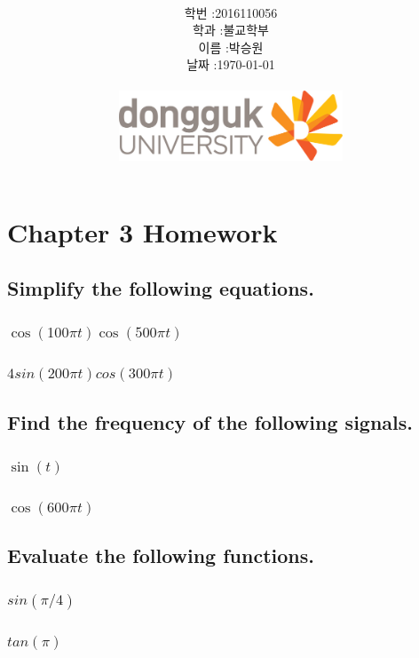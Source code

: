 \documentclass[12pt,a4paper]{article}
\title{
	\centering
	\pgfornament[width=12cm,color=teal]{84}\\
	\vspace{1cm}
	\fontsize{50}{50} \selectfont {정보통신 수학 및 실습\\Homework}\\
		\pgfornament[width=12cm,color=teal]{88}\\
	\vfill}
\author{
	\LARGE
	\begin{tabular}{rl}
		\hline
		학번 : & 2016110056\\ 
		학과 : & 불교학부 \\
		이름 : & 박승원\\
		날짜 : & \today\\
		\hline
	\end{tabular}\vspace{2cm}
	\\
\includegraphics[width=0.5\textwidth]{logo.jpg}
	}
\date{}
\begin{document}
\maketitle
{}
\noindent
\lstset{language=matlab, columns=flexible, tabsize=4, frame=shadowbox, showstringspaces=false, breaklines=true, upquote=true, basicstyle=\normalsize}

\renewcommand{\thesubsubsection}{\alph{subsubsection})}
\renewcommand{\thesubsection}{\arabic{subsection}.}
\newpage
\section*{Chapter 3 Homework}

\subsection{Simplify the following equations.}

\subsubsection{$\cos(100\pi t)\cos(500\pi t)$} 
\subsubsection{$4sin(200\pi t)cos(300\pi t)$} 

\subsection{Find the frequency of the following signals.} 
\subsubsection{$\sin(t)$} 
\subsubsection{$\cos(600\pi t)$} 

\subsection{Evaluate the following functions.} 
\subsubsection{$sin(\pi /4)$} 
\subsubsection{$tan(\pi )$} 
\end{document}
